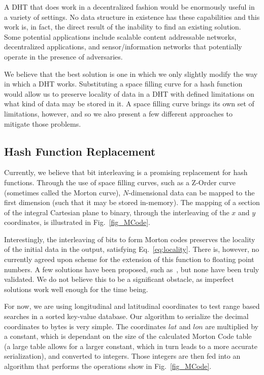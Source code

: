 \documentclass[10pt]{IEEEtran}
\begin{document}
\par A DHT that does work in a decentralized fashion would be enormously useful in a variety of settings. No data structure in existence has these capabilities and this work is, in fact, the direct result of the inability to find an existing solution. Some potential applications include scalable content addressable networks, decentralized applications, and sensor/information networks that potentially operate in the presence of adversaries.




\par We believe that the best solution is one in which we only slightly modify the way in which a DHT works. Substituting a space filling curve for a hash function would allow us to preserve locality of data in a DHT with defined limitations on what kind of data may be stored in it. A space filling curve brings its own set of limitations, however, and so we also present a few different approaches to mitigate those problems.

\subsection{Hash Function Replacement}

\par Currently, we believe that bit interleaving is a promising replacement for hash functions. Through the use of space filling curves, such as a Z-Order curve (sometimes called the Morton curve), $N$-dimensional data can be mapped to the first dimension (such that it may be stored in-memory). The mapping of a section of the integral Cartesian plane to binary, through the interleaving of the $x$ and $y$ coordinates, is illustrated in Fig.~\ref{fig_MCode}.

\par Interestingly, the interleaving of bits to form Morton codes preserves the locality of the initial data in the output, satisfying Eq.~\ref{eq:locality}. There is, however, no currently agreed upon scheme for the extension of this function to floating point numbers. A few solutions have been proposed, such as~\cite{Connor:2010eq}, but none have been truly validated. We do not believe this to be a significant obstacle, as imperfect solutions work well enough for the time being.

\par For now, we are using longitudinal and latitudinal coordinates to test range based searches in a sorted key-value database. Our algorithm to serialize the decimal coordinates to bytes is very simple. The coordinates $lat$ and $lon$ are multiplied by a constant, which is dependant on the size of the calculated Morton Code table (a large table allows for a larger constant, which in turn leads to a more accurate serialization), and converted to integers. Those integers are then fed into an algorithm that performs the operations show in Fig.~\ref{fig_MCode}.
\end{document}
